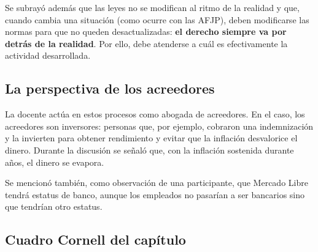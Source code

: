 \documentclass[12pt,oneside]{book}
\begin{document}
Se subrayó además que las leyes no se modifican al ritmo de la realidad y que, cuando cambia una situación (como ocurre con las AFJP), deben modificarse las normas para que no queden desactualizadas: \textbf{el derecho siempre va por detrás de la realidad}. Por ello, debe atenderse a cuál es efectivamente la actividad desarrollada.

\subsection{La perspectiva de los acreedores}

La docente actúa en estos procesos como abogada de acreedores. En el caso, los acreedores son inversores: personas que, por ejemplo, cobraron una indemnización y la invierten para obtener rendimiento y evitar que la inflación desvalorice el dinero. Durante la discusión se señaló que, con la inflación sostenida durante años, el dinero se evapora.

Se mencionó también, como observación de una participante, que Mercado Libre tendrá estatus de banco, aunque los empleados no pasarían a ser bancarios sino que tendrían otro estatus.

\subsection*{Cuadro Cornell del capítulo}
\end{document}

